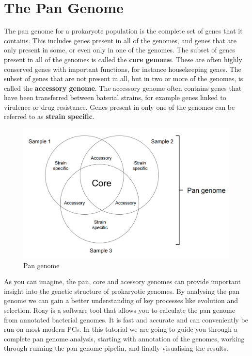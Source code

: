 \documentclass[11pt]{article}
\makeatletter
\def\maxwidth{\ifdim\Gin@nat@width>\linewidth\linewidth
    \else\Gin@nat@width\fi}
\let\Oldincludegraphics\includegraphics
\renewcommand{\includegraphics}[1]{\Oldincludegraphics[width=.8\maxwidth, height=.55\textheight, keepaspectratio]{#1}}
\makeatother
\begin{document}
\newpage






    \hypertarget{the-pan-genome}{%
\section{The Pan Genome}\label{the-pan-genome}}

The pan genome for a prokaryote population is the complete set of genes
that it contains. This includes genes present in all of the genomes, and
genes that are only present in some, or even only in one of the genomes.
The subset of genes present in all of the genomes is called the
\textbf{core genome}. These are often highly conserved genes with
important functions, for instance housekeeping genes. The subset of
genes that are not present in all, but in two or more of the genomes, is
called the \textbf{accessory genome}. The accessory genome often
contains genes that have been transferred between baterial strains, for
example genes linked to virulence or drug resistance. Genes present in
only one of the genomes can be referred to as \textbf{strain specific}.

    \begin{figure}[!h]
\centering
\includegraphics{img/pangenome.png}
\caption{Pan genome}
\end{figure}

    As you can imagine, the pan, core and acessory genomes can provide
important insight into the genetic structure of prokaryotic genomes. By
analysing the pan genome we can gain a better understanding of key
processes like evolution and selection. Roay is a software tool that
allows you to calculate the pan genome from annotated bacterial genomes.
It is fast and accurate and can conveniently be run on most modern PCs.
In this tutorial we are going to guide you through a complete pan genome
analysis, starting with annotation of the genomes, working through
running the pan genome pipelin, and finally visualising the results.
\end{document}

